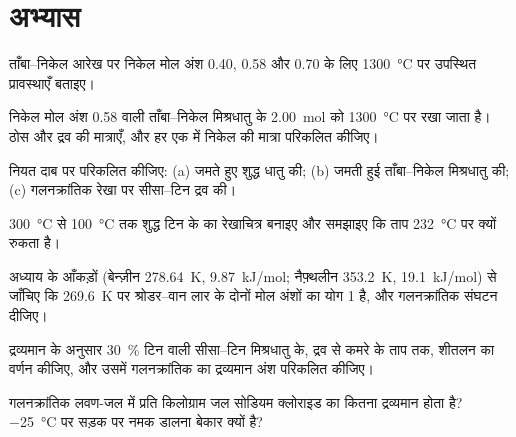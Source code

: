 \section{अभ्यास}

\begin{exercise}[$\star$]\label{exo:b2:solid-liquid-diagrams:1}
ताँबा--निकेल आरेख पर निकेल मोल अंश 0.40, 0.58 और 0.70 के लिए
\qty{1300}{\degreeCelsius} पर उपस्थित प्रावस्थाएँ बताइए।
\end{exercise}

\begin{exercise}[$\star$]\label{exo:b2:solid-liquid-diagrams:2}
निकेल मोल अंश 0.58 वाली ताँबा--निकेल मिश्रधातु के \qty{2.00}{mol} को
\qty{1300}{\degreeCelsius} पर रखा जाता है। ठोस और द्रव की मात्राएँ, और हर एक में
निकेल की मात्रा परिकलित कीजिए।
\end{exercise}

\begin{exercise}[$\star$]\label{exo:b2:solid-liquid-diagrams:3}
नियत दाब पर  परिकलित कीजिए: (a) जमते हुए शुद्ध धातु की;
(b) जमती हुई ताँबा--निकेल मिश्रधातु की; (c) गलनक्रांतिक रेखा पर सीसा--टिन
द्रव की।
\end{exercise}

\begin{exercise}[$\star$]\label{exo:b2:solid-liquid-diagrams:4}
\qty{300}{\degreeCelsius} से \qty{100}{\degreeCelsius} तक शुद्ध टिन के 
का रेखाचित्र बनाइए और समझाइए कि ताप
\qty{232}{\degreeCelsius} पर क्यों रुकता है।
\end{exercise}

\begin{exercise}[$\star\star$]\label{exo:b2:solid-liquid-diagrams:5}
अध्याय के आँकड़ों (बेन्ज़ीन \qty{278.64}{K}, \qty{9.87}{kJ/mol};
नैफ़्थलीन \qty{353.2}{K}, \qty{19.1}{kJ/mol}) से जाँचिए कि
\qty{269.6}{K} पर श्रोडर--वान लार के दोनों मोल अंशों का योग 1 है, और
गलनक्रांतिक संघटन दीजिए।
\end{exercise}

\begin{exercise}[$\star\star$]\label{exo:b2:solid-liquid-diagrams:6}
द्रव्यमान के अनुसार 30~\% टिन वाली सीसा--टिन मिश्रधातु के, द्रव से
कमरे के ताप तक, शीतलन का वर्णन कीजिए, और उसमें गलनक्रांतिक का द्रव्यमान अंश परिकलित कीजिए।
\end{exercise}

\begin{exercise}[$\star\star$]\label{exo:b2:solid-liquid-diagrams:7}
गलनक्रांतिक लवण-जल में प्रति किलोग्राम जल सोडियम क्लोराइड का कितना द्रव्यमान
होता है? \qty{-25}{\degreeCelsius} पर सड़क पर नमक डालना बेकार क्यों है?
\end{exercise}

